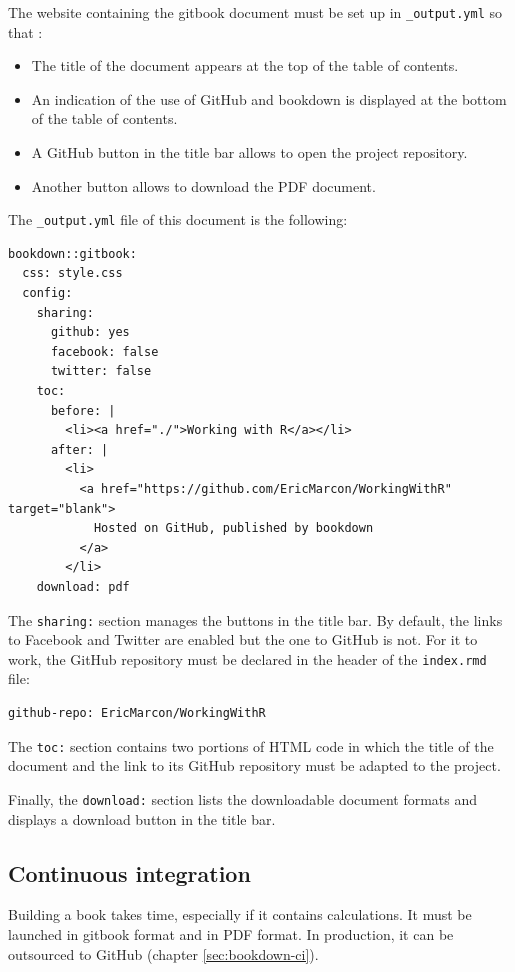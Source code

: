 \documentclass[
  12pt,
  american,
  a4paper,
  extrafontsizes,onecolumn,openright
  ]{memoir}
\providecommand{\tightlist}{%
  \setlength{\itemsep}{0pt}\setlength{\parskip}{0pt}}
\begin{document}
The website containing the gitbook document must be set up in \texttt{\_output.yml} so that :

\begin{itemize}
\tightlist
\item
  The title of the document appears at the top of the table of contents.
\item
  An indication of the use of GitHub and bookdown is displayed at the bottom of the table of contents.
\item
  A GitHub button in the title bar allows to open the project repository.
\item
  Another button allows to download the PDF document.
\end{itemize}

The \texttt{\_output.yml} file of this document is the following:

\begin{verbatim}
bookdown::gitbook:
  css: style.css
  config:
    sharing:
      github: yes
      facebook: false
      twitter: false
    toc:
      before: |
        <li><a href="./">Working with R</a></li>
      after: |
        <li>
          <a href="https://github.com/EricMarcon/WorkingWithR" target="blank">
            Hosted on GitHub, published by bookdown
          </a>
        </li>
    download: pdf
\end{verbatim}

The \texttt{sharing:} section manages the buttons in the title bar.
By default, the links to Facebook and Twitter are enabled but the one to GitHub is not.
For it to work, the GitHub repository must be declared in the header of the \texttt{index.rmd} file:

\begin{verbatim}
github-repo: EricMarcon/WorkingWithR
\end{verbatim}

The \texttt{toc:} section contains two portions of HTML code in which the title of the document and the link to its GitHub repository must be adapted to the project.

Finally, the \texttt{download:} section lists the downloadable document formats and displays a download button in the title bar.

\subsection{Continuous integration}\label{sec:rediger-ouvrage-ci}

Building a book takes time, especially if it contains calculations.
It must be launched in gitbook format and in PDF format.
In production, it can be outsourced to GitHub (chapter \ref{sec:bookdown-ci}).
\end{document}

